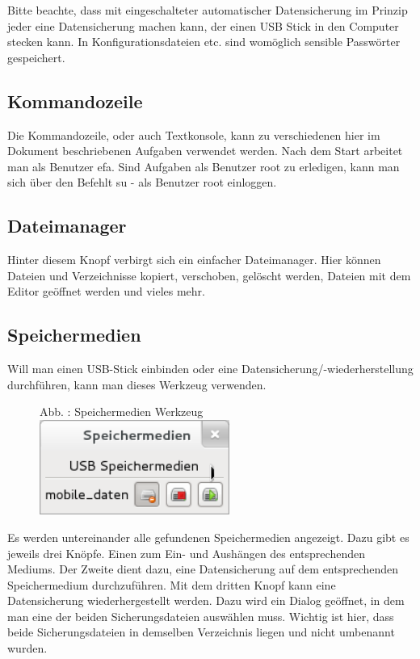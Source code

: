 \documentclass[a4paper,12pt,twoside]{article}
\newcounter{Abb}
\renewcommand\theAbb{\arabic{Abb}}
\begin{document}
Bitte beachte, dass mit eingeschalteter automatischer Datensicherung im
Prinzip jeder eine Datensicherung machen kann, der einen USB Stick in
den Computer stecken kann. In Konfigurationsdateien etc. sind womöglich
sensible Passwörter gespeichert.


\bigskip

\subsection{Kommandozeile}
Die Kommandozeile, oder auch Textkonsole, kann zu verschiedenen hier im
Dokument beschriebenen Aufgaben verwendet werden. Nach dem Start
arbeitet man als Benutzer {\textquotedbl}efa{\textquotedbl}. Sind
Aufgaben als Benutzer {\textquotedbl}root{\textquotedbl} zu erledigen,
kann man sich über den Befehlt {\textquotedbl}su -{\textquotedbl} als
Benutzer {\textquotedbl}root{\textquotedbl} einloggen.


\bigskip

\subsection{Dateimanager}
Hinter diesem Knopf verbirgt sich ein einfacher Dateimanager. Hier
können Dateien und Verzeichnisse kopiert, verschoben, gelöscht werden,
Dateien mit dem Editor geöffnet werden und vieles mehr.

\subsection[Speichermedien]{Speichermedien}
\label{bkm:RefHeading1592839742929}Will man einen USB-Stick einbinden
oder eine Datensicherung/-wiederherstellung durchführen, kann man
dieses Werkzeug verwenden.


\bigskip



\begin{figure}
\centering
\begin{minipage}{8.375cm}
Abb. \stepcounter{Abb}{\theAbb}: Speichermedien Werkzeug
\includegraphics[width=6.212cm,height=3.106cm]{efaLivede-img/efaLivede-img20.png}\end{minipage}
\end{figure}
Es werden untereinander alle gefundenen Speichermedien angezeigt. Dazu
gibt es jeweils drei Knöpfe. Einen zum Ein- und Aushängen des
entsprechenden Mediums. Der Zweite dient dazu, eine Datensicherung auf
dem entsprechenden Speichermedium durchzuführen. Mit dem dritten Knopf
kann eine Datensicherung wiederhergestellt werden. Dazu wird ein Dialog
geöffnet, in dem man eine der beiden Sicherungsdateien auswählen muss.
Wichtig ist hier, dass beide Sicherungsdateien in demselben Verzeichnis
liegen und nicht umbenannt wurden.
\end{document}
